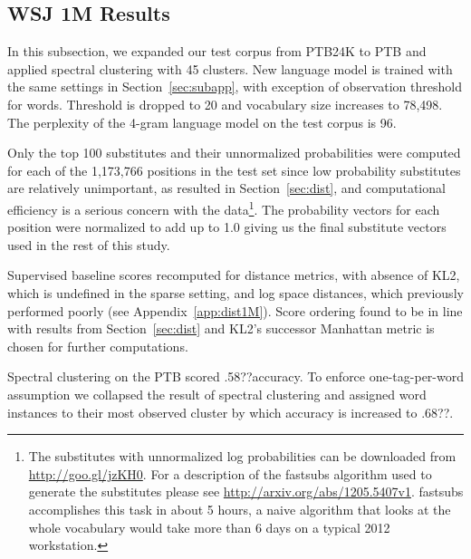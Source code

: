 \subsection{WSJ 1M Results}
\label{sec:wsj}


In this subsection, we expanded our test corpus from PTB24K to PTB and
applied spectral clustering with 45 clusters.
%
New language model is trained with the same settings in
Section~\ref{sec:subapp}, with exception of observation threshold for
words.  Threshold is dropped to 20 and vocabulary size increases to
78,498.
%
The perplexity of the 4-gram language model on the test corpus is 96.

Only the top 100 substitutes and their unnormalized probabilities were
computed for each of the 1,173,766 positions in the test set since low
probability substitutes are relatively unimportant, as resulted in
Section~\ref{sec:dist}, and computational efficiency is a serious
concern with the data\footnote{The substitutes with unnormalized log
  probabilities can be downloaded from
  \mbox{\url{http://goo.gl/jzKH0}}.  For a description of the {\sc
    fastsubs} algorithm used to generate the substitutes please see
  \mbox{\url{http://arxiv.org/abs/1205.5407v1}}.  {\sc fastsubs}
  accomplishes this task in about 5 hours, a naive algorithm that
  looks at the whole vocabulary would take more than 6 days on a
  typical 2012 workstation.}.  The probability vectors for each
position were normalized to add up to 1.0 giving us the final
substitute vectors used in the rest of this study.

Supervised baseline scores recomputed for distance metrics, with
absence of KL2, which is undefined in the sparse setting, and log
space distances, which previously performed poorly
(see Appendix~\ref{app:dist1M}). Score ordering found to be in line with
results from Section~\ref{sec:dist} and KL2's successor Manhattan
metric is chosen for further computations.


Spectral clustering on the PTB scored .58??\mto accuracy.  To
enforce one-tag-per-word assumption we collapsed the result of
spectral clustering and assigned word instances to their most observed
cluster by which \mto accuracy is increased to .68??.
